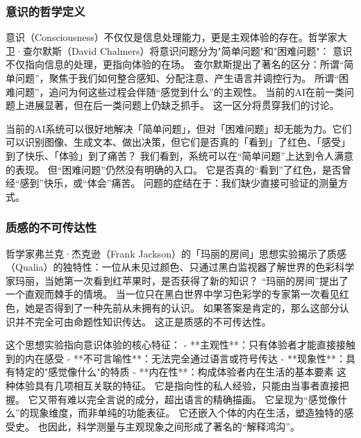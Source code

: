 \subsubsection{意识的哲学定义}

意识（Consciousness）不仅仅是信息处理能力，更是主观体验的存在。哲学家大卫·查尔默斯（David Chalmers）将意识问题分为"简单问题"和"困难问题"：
意识不仅指向信息的处理，更指向体验的在场。
查尔默斯提出了著名的区分：所谓“简单问题”，聚焦于我们如何整合感知、分配注意、产生语言并调控行为。
所谓“困难问题”，追问为何这些过程会伴随“感觉到什么”的主观性。
当前的AI在前一类问题上进展显著，但在后一类问题上仍缺乏抓手。
这一区分将贯穿我们的讨论。

当前的AI系统可以很好地解决「简单问题」，但对「困难问题」却无能为力。它们可以识别图像、生成文本、做出决策，但它们是否真的「看到」了红色、「感受」到了快乐、「体验」到了痛苦？
我们看到，系统可以在“简单问题”上达到令人满意的表现。
但“困难问题”仍然没有明确的入口。
它是否真的“看到”了红色，是否曾经“感到”快乐，或“体会”痛苦。
问题的症结在于：我们缺少直接可验证的测量方式。

\subsubsection{质感的不可传达性}

哲学家弗兰克·杰克逊（Frank Jackson）的「玛丽的房间」思想实验揭示了质感（Qualia）的独特性：一位从未见过颜色、只通过黑白监视器了解世界的色彩科学家玛丽，当她第一次看到红苹果时，是否获得了新的知识？
“玛丽的房间”提出了一个直观而棘手的情境。
当一位只在黑白世界中学习色彩学的专家第一次看见红色，她是否得到了一种先前从未拥有的认识。
如果答案是肯定的，那么这部分认识并不完全可由命题性知识传达。
这正是质感的不可传达性。

这个思想实验指向意识体验的核心特征：
- **主观性**：只有体验者才能直接接触到的内在感受
- **不可言喻性**：无法完全通过语言或符号传达
- **现象性**：具有特定的"感觉像什么"的特质
- **内在性**：构成体验者内在生活的基本要素
这种体验具有几项相互关联的特征。
它是指向性的私人经验，只能由当事者直接把握。
它又带有难以完全言说的成分，超出语言的精确描画。
它呈现为“感觉像什么”的现象维度，而非单纯的功能表征。
它还嵌入个体的内在生活，塑造独特的感受史。
也因此，科学测量与主观现象之间形成了著名的“解释鸿沟”。


